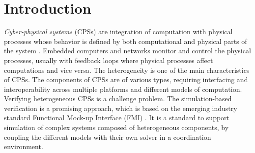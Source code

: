 \section{Introduction}

\textit{Cyber-physical systems} (CPSs) are integration of computation with physical processes whose behavior is defined by both computational and physical parts of the system \cite{Zanero17}. Embedded computers and networks monitor and control the physical processes, usually with feedback loops where physical processes affect computations and vice versa. The heterogeneity is one of the main characteristics of CPSs. The components of CPSs are of various types, requiring interfacing and interoperability across multiple platforms and different models of computation. Verifying heterogeneous CPSs is a challenge problem. The simulation-based verification is a promising approach, which is based on the emerging industry standard Functional Mock-up Interface (FMI) \cite{Blochwitz2011The}\cite{BromanBGLMTW13}. It is a standard to support simulation of complex systems composed of heterogeneous components, by coupling the different models with their own solver in a coordination environment.

